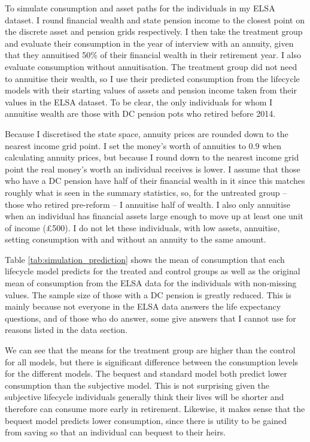 \documentclass[12pt]{article}
\begin{document}
To simulate consumption and asset paths for the individuals in my ELSA dataset.
I round financial wealth and state pension income to the closest point on the
discrete asset and pension grids respectively. I then take the treatment group
and evaluate their consumption in the year of interview with an annuity, given
that they annuitised 50\% of their financial wealth in their retirement year. I
also evaluate consumption without annuitisation. The treatment group did not
need to annuitise their wealth, so I use their predicted consumption from the
lifecycle models with their starting values of assets and pension income taken
from their values in the ELSA dataset. To be clear, the only individuals for
whom I annuitise wealth are those with DC pension pots who retired before 2014.

Because I discretised the state space, annuity prices are rounded down to the
nearest income grid point. I set the money's worth of annuities to $0.9$ when
calculating annuity prices, but because I round down to the nearest income grid
point the real money's worth an individual receives is lower. I assume that
those who have a DC pension have half of their financial wealth in it since this
matches roughly what is seen in the summary statistics, so, for the untreated
group -- those who retired pre-reform -- I annuitise half of wealth. I also only
annuitise when an individual has financial assets large enough to move up at
least one unit of income (£500). I do not let these individuals, with low
assets, annuitise, setting consumption with and without an annuity to the same
amount.




Table \ref{tab:simulation_prediction} shows the mean of consumption that each
lifecycle model predicts for the treated and control groups as well as the
original mean of consumption from the ELSA data for the individuals with
non-missing values. The sample size of those with a DC pension is greatly
reduced. This is mainly because not everyone in the ELSA data answers the life
expectancy questions, and of those who do answer, some give answers that I
cannot use for reasons listed in the data section.

We can see that the means for the treatment group are higher than the control
for all models, but there is significant difference between the consumption
levels for the different models. The bequest and standard model both predict
lower consumption than the subjective model. This is not surprising given the
subjective lifecycle individuals generally think their lives will be shorter and
therefore can consume more early in retirement. Likewise, it makes sense that
the bequest model predicts lower consumption, since there is utility to be
gained from saving so that an individual can bequest to their heirs.
\end{document}
